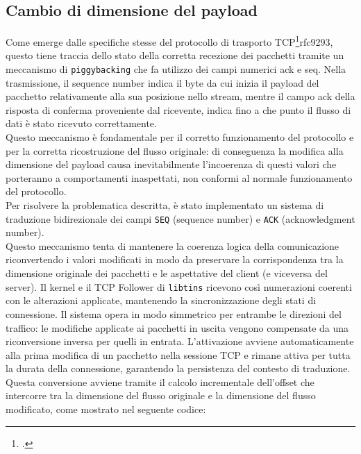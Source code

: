 \subsection{Cambio di dimensione del payload}

Come emerge dalle specifiche stesse del protocollo di trasporto TCP\footcite{RFC9293, Transmission Control Protocol (TCP)}{rfc9293}, questo tiene traccia dello stato della corretta recezione dei pacchetti tramite un meccanismo di \texttt{piggybacking} che fa utilizzo dei campi numerici ack e seq.
Nella trasmissione, il sequence number indica il byte da cui inizia il payload del pacchetto relativamente alla sua posizione nello stream, mentre il campo ack della risposta di conferma proveniente dal ricevente, indica fino a che punto il flusso di dati è stato ricevuto correttamente.\\
Questo meccanismo è fondamentale per il corretto funzionamento del protocollo e per la corretta ricostruzione del flusso originale: di conseguenza la modifica alla dimensione del payload causa inevitabilmente l'incoerenza di questi valori che porteranno a comportamenti inaspettati, non conformi al normale funzionamento del protocollo.\\

Per risolvere la problematica descritta, è stato implementato un sistema di traduzione bidirezionale dei campi \texttt{SEQ} (sequence number) e \texttt{ACK} (acknowledgment number).\\
Questo meccanismo tenta di mantenere la coerenza logica della comunicazione riconvertendo i valori modificati in modo da preservare la corrispondenza tra la dimensione originale dei pacchetti e le aspettative del client (e viceversa del server).
Il kernel e il TCP Follower di \texttt{libtins} ricevono così numerazioni coerenti con le alterazioni applicate, mantenendo la sincronizzazione degli stati di connessione.
Il sistema opera in modo simmetrico per entrambe le direzioni del traffico: le modifiche applicate ai pacchetti in uscita vengono compensate da una riconversione inversa per quelli in entrata. L'attivazione avviene automaticamente alla prima modifica di un pacchetto nella sessione TCP e rimane attiva per tutta la durata della connessione, garantendo la persistenza del contesto di traduzione.\\
Questa conversione avviene tramite il calcolo incrementale dell'offset che intercorre tra la dimensione del flusso originale e la dimensione del flusso modificato, come mostrato nel seguente codice:

